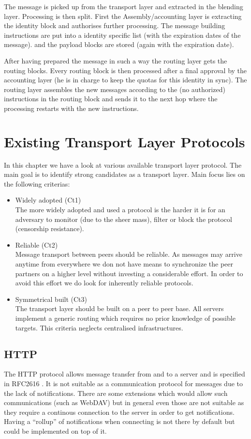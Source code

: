 The message is picked up from the transport layer and extracted in the blending layer. Processing is then split. First the Assembly/accounting layer is extracting the identity block and authorises further processing. The message building instructions are put into a identity specific list (with the expiration dates of the message). and the payload blocks are stored (again with the expiration date). 

After having prepared the message in such a way the routing layer gets the routing blocks. Every routing block is then processed after a final approval by the accounting layer (he is in charge to keep the quotas for this identity in  sync). The routing layer assembles the new messages according to the (no authorized) instructions in the routing block and sends it to the next hop where the processing restarts with the new instructions. 

\chapter{Existing Transport Layer Protocols \label{sec:existingTPP}}
In this chapter we have a look at various available transport layer protocol. The main goal is to identify strong candidates as a transport layer. Main focus lies on the following criterias:
\begin{itemize}
	\item Widely adopted (Ct1)\\
	The more widely adopted and used a protocol is the harder it is for an adversary to monitor (due to the sheer mass), filter or block the protocol (censorship resistance).
	\item Reliable (Ct2)\\
	Message transport between peers should be reliable. As messages may arrive anytime from everywhere we don not have means to synchronize the peer partners on a higher level without investing a considerable effort. In order to avoid this effort we do look for inherently reliable protocols.
	\item Symmetrical built (Ct3)\\
	The transport layer should be built on a peer to peer base. All servers implement a generic routing which requires no prior knowledge of possible targets. This criteria neglects centralised infrastructures.
\end{itemize}

\section{HTTP}
The HTTP protocol allows message transfer from and to a server and is specified in RFC2616 \cite{RFC2616}. It is not suitable as a communication protocol for messages due to the lack of notifications. There are some extensions which would allow such communications (such as WebDAV) but in general even those are not suitable as they require a continous connection to the server in order to get notifications. Having a ``rollup'' of notifications when connecting is not there by default but could be implemented on top of it. 

